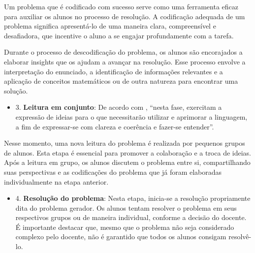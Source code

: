 Um problema que é codificado com sucesso serve como uma ferramenta eficaz para auxiliar os alunos no processo de resolução. A codificação adequada de um problema significa apresentá-lo de uma maneira clara, compreensível e desafiadora, que incentive o aluno a se engajar profundamente com a tarefa.

Durante o processo de descodificação do problema, os alunos são encorajados a elaborar insights que os ajudam a avançar na resolução. Esse processo envolve a interpretação do enunciado, a identificação de informações relevantes e a aplicação de conceitos matemáticos ou de outra natureza para encontrar uma solução.


\begin{itemize}
    \item 3. \textbf{Leitura em conjunto}: De acordo com , ``nesta fase, exercitam a expressão de ideias para o que necessitarão utilizar e aprimorar a linguagem, a fim de expressar-se com clareza e coerência e fazer-se entender''.
\end{itemize}

Nesse momento, uma nova leitura do problema é realizada por pequenos grupos de alunos. Esta etapa é essencial para promover a colaboração e a troca de ideias. Após a leitura em grupo, os alunos discutem o problema entre si, compartilhando suas perspectivas e as codificações do problema que já foram elaboradas individualmente na etapa anterior.


\begin{itemize}
    \item 4. \textbf{Resolução do problema}: Nesta etapa, inicia-se a resolução propriamente dita do problema gerador. Os alunos tentam resolver o problema em seus respectivos grupos ou de maneira individual, conforme a decisão do docente. É importante destacar que, mesmo que o problema não seja considerado complexo pelo docente, não é garantido que todos os alunos consigam resolvê-lo.
\end{itemize}

